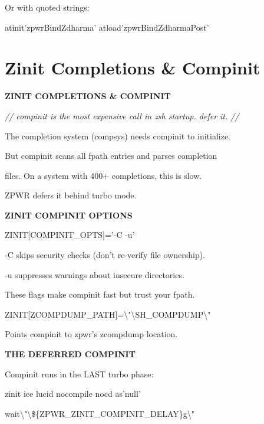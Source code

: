 \documentclass[11pt,a4paper,twoside]{book}
\begin{document}
Or with quoted strings:

\begin{codebox}
atinit'zpwrBindZdharma' atload'zpwrBindZdharmaPost'\\
\end{codebox}


\vspace{16pt}

\section{Zinit Completions \& Compinit}


\vspace{10pt}
{\large\bfseries\color{neoncyan} ZINIT COMPLETIONS \& COMPINIT}\vspace{6pt}

{\small\itshape\color{dimtext} // compinit is the most expensive call in zsh startup. defer it. //}

The completion system (compsys) needs compinit to initialize.

But compinit scans all fpath entries and parses completion

files. On a system with 400+ completions, this is slow.

ZPWR defers it behind turbo mode.


\vspace{12pt}
{\bfseries\color{neonyellow} ZINIT COMPINIT OPTIONS}\vspace{4pt}

ZINIT[COMPINIT\_OPTS]='-C -u'

-C skips security checks (don't re-verify file ownership).

-u suppresses warnings about insecure directories.

These flags make compinit fast but trust your fpath.

ZINIT[ZCOMPDUMP\_PATH]=\textbackslash{}"\textbackslash{}SH\_COMPDUMP\textbackslash{}"

Points compinit to zpwr's zcompdump location.


\vspace{12pt}
{\bfseries\color{neonyellow} THE DEFERRED COMPINIT}\vspace{4pt}

Compinit runs in the LAST turbo phase:

zinit ice lucid nocompile nocd as'null'

wait\textbackslash{}"\textbackslash{}\$\{ZPWR\_ZINIT\_COMPINIT\_DELAY\}g\textbackslash{}"
\end{document}
